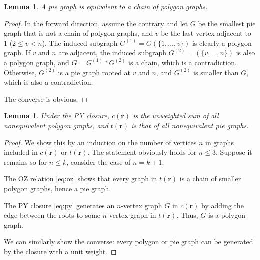 \documentclass[notitlepage,preprint]{revtex4-1}
\newtheorem{lemm}[thrm]{Lemma}
\newcommand{\vct}[1]{\mathbf{#1}}
\providecommand{\vr}{} %
\renewcommand{\vr}{\vct{r}}
\begin{document}
\begin{lemm}
A pie graph is equivalent to
  a chain of polygon graphs.
\label{thm:pycat}
\end{lemm}

\begin{proof}
In the forward direction, assume the contrary and
%
let $G$ be the smallest pie graph
  that is not a chain of polygon graphs,
%
and $v$ be the last vertex adjacent to $1$ ($2 \le v < n$).
%
The induced subgraph $G^{(1)} = G(\{1, \dots, v\})$
  is clearly a polygon graph.
%
If $v$ and $n$ are adjacent,
  the induced subgraph $G^{(2)} = (\{v, \dots, n\})$
  is also a polygon graph,
  and $G = G^{(1)} * G^{(2)}$ is a chain,
  which is a contradiction.
%
Otherwise, $G^{(2)}$ is a pie graph
  rooted at $v$ and $n$,
  and $G^{(2)}$ is smaller than $G$,
  which is also a contradiction.

The converse is obvious.
\end{proof}



\begin{lemm}
Under the PY closure,
  $c(\vr)$ is the unweighted sum of
  all nonequivalent polygon graphs,
  and $t(\vr)$ is that of all nonequivalent
  pie graphs\cite{rice1965}.
\label{thm:pycrsum}
\end{lemm}

\begin{proof}
We show this by an induction on the number of vertices $n$ in
  graphs included in $c(\vr)$ or $t(\vr)$.
%
The statement obviously holds for $n \le 3$.
%
Suppose it remains so for $n \le k$,
consider the case of $n = k + 1$.

The OZ relation \eqref{eq:oz}
  shows that every graph in $t(\vr)$
  is a chain of smaller polygon graphs,
  hence a pie graph. %

The PY closure \eqref{eq:py} generates
  an $n$-vertex graph $G$ in $c(\vr)$
  by adding the edge between the roots
  to some $n$-vertex graph in $t(\vr)$.
%
Thus, $G$ is a polygon graph.

We can similarly show the converse:
  every polygon or pie graph
  can be generated by the closure
  with a unit weight.
\end{proof}
\end{document}

